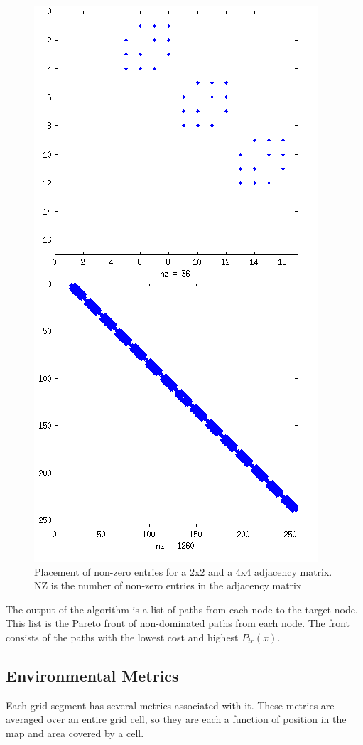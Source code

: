 \documentclass[journal]{IEEEtran}
\begin{document}
\begin{figure}[!h]
\label{speye}
\centering
\includegraphics[scale=0.8]{speye.png}
\caption{Placement of non-zero entries for a 2x2 and a 4x4 adjacency matrix. NZ is the number of non-zero entries in the adjacency matrix}
\label{fig_sim}
\end{figure}

The output of the algorithm is a list of paths from each node to the target node. This list is the Pareto front of non-dominated paths from each node. 
The front consists of the paths with the lowest cost and highest $P_{tr}(x)$. 

\subsection{Environmental Metrics}
Each grid segment has several metrics associated with it. These metrics are averaged over an entire grid cell, so they are each a function of position in the map and area covered by a cell.
\end{document}
